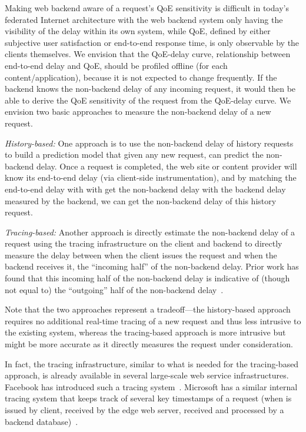 Making web backend aware of a request's QoE sensitivity is difficult in today's federated Internet architecture with the web backend system only having the visibility of the delay within its own system, while QoE, defined by either subjective user satisfaction or end-to-end response time, is only observable by the clients themselves. 
We envision that the QoE-delay curve, \ie relationship between end-to-end delay and QoE, should be profiled offline (for each content/application), because it is not expected to change frequently.
If the backend knows the non-backend delay of any incoming request, it would then be able to derive the QoE sensitivity of the request from the QoE-delay curve. 
We envision two basic approaches to measure the non-backend delay of a new request. 
\begin{packeditemize}
\item {\em History-based:}
One approach is to use the non-backend delay of history requests to build a prediction model that given any new request, can predict the non-backend delay. Once a request is completed, the web site or content provider will know its end-to-end delay (\eg via client-side instrumentation), and by matching the end-to-end delay with with get the non-backend delay with the backend delay measured by the backend, we can get the non-backend delay of this history request.

\item {\em Tracing-based:}
Another approach is directly estimate the non-backend delay of a request using the tracing infrastructure on the client and backend to directly measure the delay between when the client issues the request and when the backend receives it, \ie the ``incoming half'' of the non-backend delay. Prior work has found that this incoming half of the non-backend delay is indicative of (though not equal to) the ``outgoing'' half of the non-backend delay~\cite{timecard}.
\end{packeditemize}
Note that the two approaches represent a tradeoff---the history-based approach requires no additional real-time tracing of a new request and thus less intrusive to the existing system, whereas the tracing-based approach is more intrusive but might be more accurate as it directly measures the request under consideration.

In fact, the tracing infrastructure, similar to what is needed for the tracing-based approach, is already available in several large-scale web service infrastructures. Facebook has introduced such a tracing system~\cite{mystery}. Microsoft has a similar internal tracing system that keeps track of several key timestamps of a request (\eg when is issued by client, received by the edge web server, received and processed by a backend database)~\cite{lecuyer2017harvesting,odin}.

